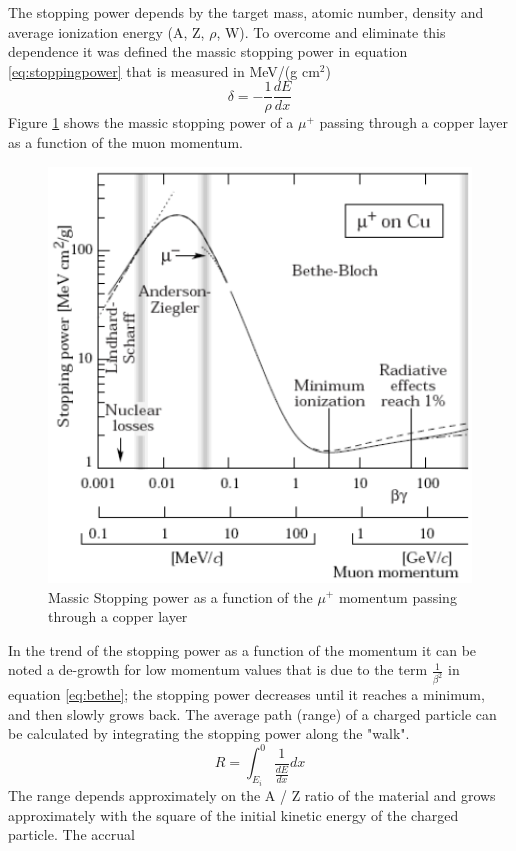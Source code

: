 \noindent The stopping power depends by the target mass, atomic number, density and average ionization energy (A, Z, $\rho$, W). To overcome and eliminate this dependence it was defined the massic stopping power in equation \ref{eq:stoppingpower} that is measured in MeV/(g cm${}^2$)
\begin{equation}\label{eq:stoppingpower}
	\delta = - \frac{1}{\rho} \frac{dE}{dx}
\end{equation}
\noindent Figure \ref{fig:massicstoppingpower} shows the massic stopping power of a $\mu^+$ passing through a copper layer as a function of the muon momentum.
\begin{figure}[H]
	\centering
	\includegraphics[width=0.7\linewidth]{IMG/ch1/MassicStoppingPower}
	\caption{Massic Stopping power as a function of the $\mu^+$ momentum passing through a copper layer}
	\label{fig:massicstoppingpower}
\end{figure}
\noindent In the trend of the stopping power as a function of the momentum it can be noted a de-growth for low momentum values that is due to the term $\frac{1}{\beta^2}$ in equation \ref{eq:bethe}; the stopping power decreases until it reaches a minimum, and then slowly grows back.
\newline
The average path (range) of a charged particle can be calculated by integrating the stopping power along the "walk".
\begin{equation}\label{eq:range}
	R=\int_{E_i}^{0} \frac{1}{\frac{dE}{dx}}dx
\end{equation}
\noindent The range depends approximately on the A / Z ratio of the material and grows approximately with the square of the initial kinetic energy of the charged particle. The accrual
